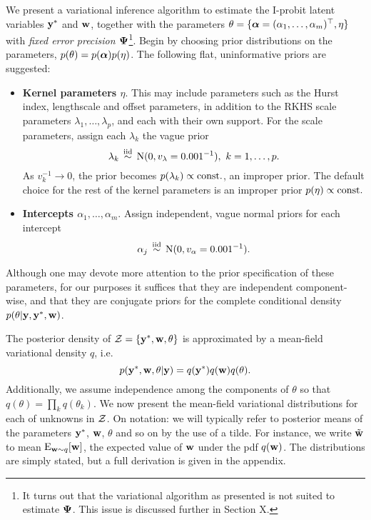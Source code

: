 We present a variational inference algorithm to estimate the I-probit latent variables ${\mathbf y}^*$ and ${\mathbf w}$, together with the parameters $\theta = \{{\bm\alpha} = (\alpha_1,\dots,\alpha_m)^\top,\eta \}$ with \emph{fixed error precision ${\bm\Psi}$}\footnote{It turns out that the variational algorithm as presented is not suited to estimate ${\bm\Psi}$. This issue is discussed further in Section X.}.
Begin by choosing prior distributions on the parameters, $p(\theta) = p({\bm\alpha})p(\eta)$. 
The following flat, uninformative priors are suggested:
\begin{itemize}
  \item \textbf{Kernel parameters $\eta$}. This may include parameters such as the Hurst index, lengthscale and offset parameters, in addition to the RKHS scale parameters $\lambda_1,\dots,\lambda_p$, and each with their own support.
  For the scale parameters, assign each $\lambda_k$ the vague prior
  \[
    \lambda_k \,\overset{\text{iid}}{\sim}\, \operatorname{N}(0,v_\lambda = 0.001^{-1}), \ k=1,\dots,p.
  \]
  As $v_k^{-1}\to 0$, the prior becomes $p(\lambda_k)\propto \text{const.}\hspace{0.01em}$, an improper prior.
  The default choice for the rest of the kernel parameters is an improper prior $p(\eta) \propto \text{const.}\hspace{0.01em}$
  \item \textbf{Intercepts $\alpha_1,\dots,\alpha_m$}. Assign independent, vague normal priors for each intercept
  \[
    \alpha_j \,\overset{\text{iid}}{\sim}\, \operatorname{N}(0,v_\alpha=0.001^{-1}).
  \]
\end{itemize}
Although one may devote more attention to the prior specification of these parameters, for our purposes it suffices that they are independent component-wise, and that they are conjugate priors for the complete conditional density $p(\theta|{\mathbf y},{\mathbf y}^*,{\mathbf w})$.

The posterior density of ${\mathcal Z} = \{{\mathbf y}^*,{\mathbf w},\theta \}$ is approximated by a mean-field variational density $q$, i.e.
\[
  p({\mathbf y}^*,{\mathbf w},\theta|{\mathbf y}) = q({\mathbf y}^*)q({\mathbf w})q(\theta).
\]
Additionally, we assume independence among the components of $\theta$ so that $q(\theta) = \prod_k q(\theta_k)$.
We now present the mean-field variational distributions for each of unknowns in ${\mathcal Z}$.
On notation: we will typically refer to posterior means of the parameters ${\mathbf y}^*$, ${\mathbf w}$, $\theta$ and so on by the use of a tilde.
For instance, we write $\tilde{{\mathbf w}}$ to mean $\operatorname{E}_{{\mathbf w} \sim  q}[{\mathbf w}]$, the expected value of ${\mathbf w}$ under the pdf $ q({\mathbf w})$.
The distributions are simply stated, but a full derivation is given in the appendix.

